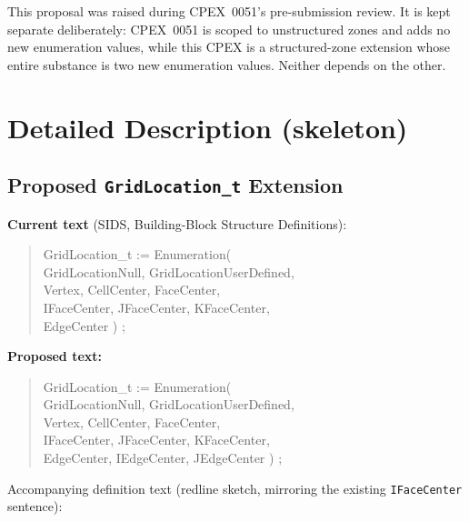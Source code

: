 \documentclass[11pt,letterpaper]{article}
\newenvironment{sidsold}{%
  \par\vspace{0.6em}\noindent
  \begin{quote}\color{black!55}\ttfamily\small\itshape
}{%
  \end{quote}\vspace{-0.2em}
}
\newenvironment{sidsnew}{%
  \par\noindent
  \begin{quote}\color{cgnsblue!85}\ttfamily\small\bfseries
}{%
  \end{quote}\vspace{0.6em}
}
\begin{document}
This proposal was raised during CPEX~0051's pre-submission review.
It is kept separate deliberately: CPEX~0051 is scoped to unstructured
zones and adds no new enumeration values, while this CPEX is a
structured-zone extension whose entire substance is two new enumeration
values. Neither depends on the other.

\section{Detailed Description (skeleton)}

\subsection{Proposed \texttt{GridLocation\_t} Extension}

\textbf{Current text} (SIDS, Building-Block Structure Definitions):
\begin{sidsold}
GridLocation\_t := Enumeration(\\
\hspace*{2em}GridLocationNull, GridLocationUserDefined,\\
\hspace*{2em}Vertex, CellCenter, FaceCenter,\\
\hspace*{2em}IFaceCenter, JFaceCenter, KFaceCenter,\\
\hspace*{2em}EdgeCenter ) ;
\end{sidsold}

\textbf{Proposed text:}
\begin{sidsnew}
GridLocation\_t := Enumeration(\\
\hspace*{2em}GridLocationNull, GridLocationUserDefined,\\
\hspace*{2em}Vertex, CellCenter, FaceCenter,\\
\hspace*{2em}IFaceCenter, JFaceCenter, KFaceCenter,\\
\hspace*{2em}EdgeCenter{\color{cgnsgold}, IEdgeCenter, JEdgeCenter} ) ;
\end{sidsnew}

Accompanying definition text (redline sketch, mirroring the existing
\texttt{IFaceCenter} sentence):
\end{document}
